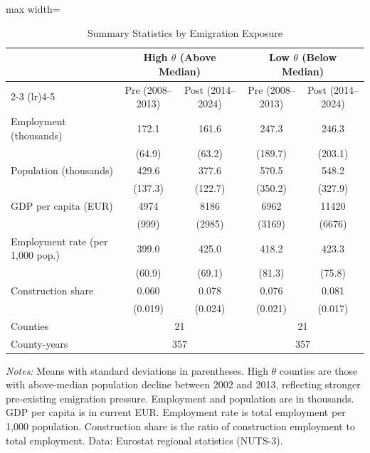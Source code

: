 \begin{table}[htbp]
\centering
\caption{Summary Statistics by Emigration Exposure}
\label{tab:summary}
\begin{adjustbox}{max width=\textwidth}
\begin{tabular}{lcccc}
\toprule
 & \multicolumn{2}{c}{High $\theta$ (Above Median)} & \multicolumn{2}{c}{Low $\theta$ (Below Median)} \\
\cmidrule(lr){2-3} \cmidrule(lr){4-5}
 & Pre (2008--2013) & Post (2014--2024) & Pre (2008--2013) & Post (2014--2024) \\
\midrule
Employment (thousands) & 172.1 & 161.6 & 247.3 & 246.3 \\
 & (64.9) & (63.2) & (189.7) & (203.1) \\
\addlinespace
Population (thousands) & 429.6 & 377.6 & 570.5 & 548.2 \\
 & (137.3) & (122.7) & (350.2) & (327.9) \\
\addlinespace
GDP per capita (EUR) & 4974 & 8186 & 6962 & 11420 \\
 & (999) & (2985) & (3169) & (6676) \\
\addlinespace
Employment rate (per 1,000 pop.) & 399.0 & 425.0 & 418.2 & 423.3 \\
 & (60.9) & (69.1) & (81.3) & (75.8) \\
\addlinespace
Construction share & 0.060 & 0.078 & 0.076 & 0.081 \\
 & (0.019) & (0.024) & (0.021) & (0.017) \\
\midrule
Counties & \multicolumn{2}{c}{21} & \multicolumn{2}{c}{21} \\
County-years & \multicolumn{2}{c}{357} & \multicolumn{2}{c}{357} \\
\bottomrule
\end{tabular}
\end{adjustbox}
\begin{flushleft}\small
\textit{Notes:} Means with standard deviations in parentheses. High $\theta$ counties are those with above-median population decline between 2002 and 2013, reflecting stronger pre-existing emigration pressure. Employment and population are in thousands. GDP per capita is in current EUR. Employment rate is total employment per 1,000 population. Construction share is the ratio of construction employment to total employment. Data: Eurostat regional statistics (NUTS-3).
\end{flushleft}
\end{table}
